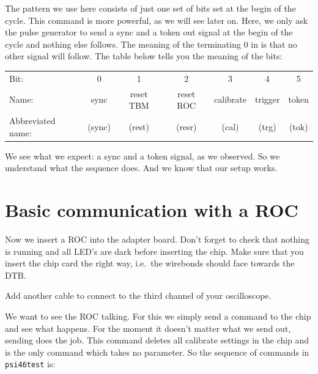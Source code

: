 The pattern we use here consists of just one set of bits set at the begin of the cycle. This command is more powerful, as we will see later on. Here, we only ask the pulse generator to send a sync and a token out signal at the begin of the cycle and nothing else follows. The meaning of the terminating 0 in  is that no other signal will follow. The table below tells you the meaning of the bits:
\begin{center}
\begin{tabular}{lcccccc}
    \toprule
Bit:  & 0 & 1 & 2 & 3 & 4 & 5 \\
Name: & sync & reset TBM & reset ROC & calibrate & trigger & token \\
Abbreviated name: & (sync) & (rest) & (resr) & (cal) & (trg) & (tok) \\
    \bottomrule
\end{tabular}
\end{center}

We see what we expect: a sync and a token signal, as we observed. So we understand what the sequence does. And we know that our setup works.



\section{Basic communication with a ROC}

Now we insert a \gls{ROC} into the adapter board. Don't forget to check that nothing is running and all LED's are dark before inserting the chip. Make sure that you insert the chip card the right way, i.e.~the wirebonds should face towards the DTB.

Add another cable to connect  to the third channel of your oscilloscope.

We want to see the \gls{ROC} talking. For this we simply send a command to the chip and see what happens. For the moment it doesn't matter what we send out, sending  does the job. This command deletes all calibrate settings in the chip and is the only command which takes no parameter. So the sequence of commands in \texttt{psi46test} is:

